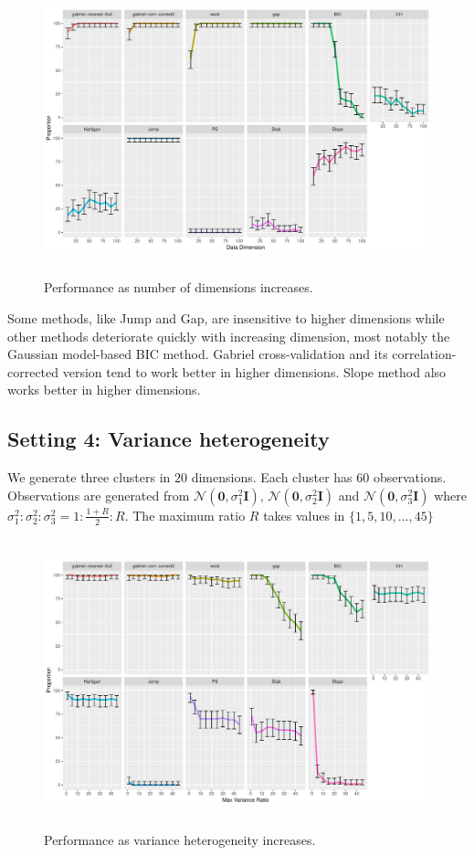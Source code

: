 \documentclass[12pt]{article}
\begin{document}
\begin{figure}[H]
\centering
\includegraphics[width=5.5in, height=3.3in]{main_code/demo/bench/setting3/Facet.pdf}
\caption{Performance as number of dimensions increases.}
\label{fig:setting3}
\end{figure}

Some methods, like Jump and Gap, are insensitive to higher dimensions while
other methods deteriorate quickly with increasing dimension, most notably the
Gaussian model-based BIC method.  Gabriel cross-validation and its
correlation-corrected version tend to work better in higher dimensions.
Slope method also works better in higher dimensions.
	

\subsection{Setting 4: Variance heterogeneity}

We generate three clusters in $20$ dimensions. Each cluster has $60$
observations.  Observations are generated from
$\mathcal{N}\left(\mathbf{0},\sigma_1^2\mathbf{I}\right)$,
$\mathcal{N}\left(\mathbf{0},\sigma_2^2\mathbf{I}\right)$ and
$\mathcal{N}\left(\mathbf{0},\sigma_3^2\mathbf{I}\right)$ where $\sigma_1^2 :
\sigma_2^2: \sigma_3^2 = 1:\frac{1+R}{2}:R$. The maximum ratio $R$ takes
values in $\{1,5,10,...,45\}$
	
\begin{figure}[H]
\centering
\includegraphics[width=5.5in, height=3.3in]{main_code/demo/bench/setting4/Facet.pdf}
\caption{Performance as variance heterogeneity increases.}
\label{fig:setting4}
\end{figure}
\end{document}
